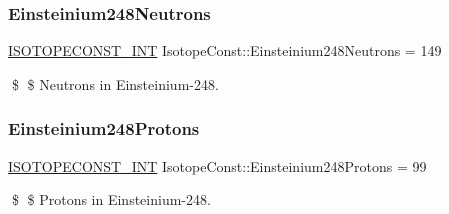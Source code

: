 \subsubsection{\texorpdfstring{Einsteinium248\+Neutrons}{Einsteinium248Neutrons}}
{\footnotesize\ttfamily \mbox{\hyperlink{group___isotope_const-_macros_ga5f18360b3e99483a35c32d789e62621c}{I\+S\+O\+T\+O\+P\+E\+C\+O\+N\+S\+T\+\_\+\+I\+NT}} Isotope\+Const\+::\+Einsteinium248\+Neutrons = 149}

\$ \$ Neutrons in Einsteinium-\/248. \mbox{\label{group___isotope_const-_einsteinium-_es248_ga0644a99f36ce25b7501ffdf3bb2d9ac1}} 
\subsubsection{\texorpdfstring{Einsteinium248\+Protons}{Einsteinium248Protons}}
{\footnotesize\ttfamily \mbox{\hyperlink{group___isotope_const-_macros_ga5f18360b3e99483a35c32d789e62621c}{I\+S\+O\+T\+O\+P\+E\+C\+O\+N\+S\+T\+\_\+\+I\+NT}} Isotope\+Const\+::\+Einsteinium248\+Protons = 99}

\$ \$ Protons in Einsteinium-\/248. 